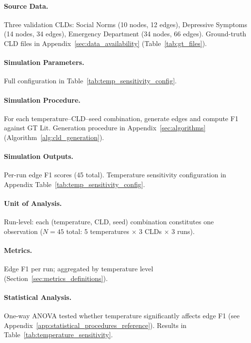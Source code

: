 \paragraph{Source Data.}
Three validation CLDs: Social Norms (10 nodes, 12 edges), Depressive Symptoms (14 nodes, 34 edges), Emergency Department (34 nodes, 66 edges).
Ground-truth CLD files in Appendix~\ref{sec:data_availability} (Table~\ref{tab:gt_files}).

\paragraph{Simulation Parameters.}
Full configuration in Table~\ref{tab:temp_sensitivity_config}.

\paragraph{Simulation Procedure.}
For each temperature--CLD--seed combination, generate edges and compute F1 against GT Lit.
Generation procedure in Appendix~\ref{sec:algorithms} (Algorithm~\ref{alg:cld_generation}).

\paragraph{Simulation Outputs.}
Per-run edge F1 scores (45 total).
Temperature sensitivity configuration in Appendix Table~\ref{tab:temp_sensitivity_config}.

\paragraph{Unit of Analysis.}
Run-level: each (temperature, CLD, seed) combination constitutes one observation ($N=45$ total: 5 temperatures $\times$ 3 CLDs $\times$ 3 runs).

\paragraph{Metrics.}
Edge F1 per run; aggregated by temperature level (Section~\ref{sec:metrics_definitions}).

\paragraph{Statistical Analysis.}
One-way ANOVA tested whether temperature significantly affects edge F1 (see Appendix~\ref{app:statistical_procedures_reference}). Results in Table~\ref{tab:temperature_sensitivity}.

